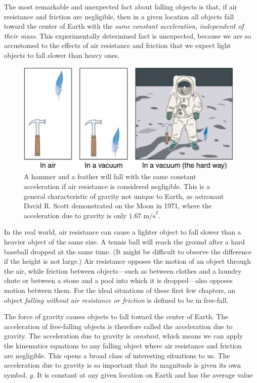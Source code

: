 \documentclass[
]{book}
\begin{document}
The most remarkable and unexpected fact about falling objects is that,
if air resistance and friction are negligible, then in a given location
all objects fall toward the center of Earth with the \emph{same constant
acceleration}, \emph{independent of their mass}. This experimentally
determined fact is unexpected, because we are so accustomed to the
effects of air resistance and friction that we expect light objects to
fall slower than heavy ones.

\begin{figure}
\hypertarget{import-auto-id4126662}{%
\centering
\includegraphics{images/Figure_02_07_00a.jpg}
\caption{A hammer and a feather will fall with the same constant acceleration
if air resistance is considered negligible. This is a general
characteristic of gravity not unique to Earth, as astronaut David R.
Scott demonstrated on the Moon in 1971, where the acceleration due to
gravity is only
\({1\text{.}\text{67\ m/s}^{2}}{}\).}\label{import-auto-id4126662}
}
\end{figure}

In the real world, air resistance can cause a lighter object to fall
slower than a heavier object of the same size. A tennis ball will reach
the ground after a hard baseball dropped at the same time. (It might be
difficult to observe the difference if the height is not large.) Air
resistance opposes the motion of an object through the air, while
friction between objects---such as between clothes and a laundry chute
or between a stone and a pool into which it is dropped---also opposes
motion between them. For the ideal situations of these first few
chapters, an object \emph{falling without air resistance or friction} is
defined to be in \protect\hypertarget{import-auto-id1714641}{}{free-fall}.

The force of gravity causes objects to fall toward the center of Earth.
The acceleration of free-falling objects is therefore called the
\protect\hypertarget{import-auto-id1707599}{}{acceleration due to gravity}.
The acceleration due to gravity is \emph{constant}, which means we can apply
the kinematics equations to any falling object where air resistance and
friction are negligible. This opens a broad class of interesting
situations to us. The acceleration due to gravity is so important that
its magnitude is given its own symbol, \(g{}\). It is constant at any
given location on Earth and has the average value
\end{document}

